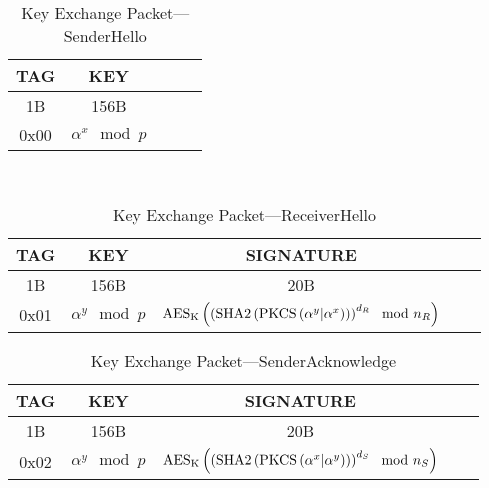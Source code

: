 \documentclass[a4paper]{article}
\begin{document}
\begin{table}[H]
    \begin{center}
        \begin{tabular}{| c | c | c | c | c |}
            \hline
            TAG & KEY \\ \hline\hline
            1B & 156B \\ \hline
            0x00 & $\alpha^x\mod{p}$ \\
            \hline
        \end{tabular}
    \end{center}
    \
    \caption{Key Exchange Packet---SenderHello}
    \label{tab:key_exchange_packet_senderhello}
\end{table}
\begin{table}[H]
    \begin{center}
        \begin{tabular}{| c | c | c | c | c |}
            \hline
            TAG & KEY & SIGNATURE \\ \hline\hline
            1B & 156B & 20B \\ \hline
            0x01 & $\alpha^y\mod{p}$ & $\text{AES}_\text{K}\left(\left(\text{SHA2}\left(\text{PKCS}\left(\alpha^y\small|\alpha^x\right)\right)\right)^{d_R}\mod{n_R}\right)$\\
            \hline
        \end{tabular}
    \end{center}
    
    \caption{Key Exchange Packet---ReceiverHello}
    \label{tab:key_exchange_packet_receiverhello}
\end{table}
\begin{table}[H]
    \begin{center}
        \begin{tabular}{| c | c | c | c | c |}
            \hline
            TAG & KEY & SIGNATURE \\ \hline\hline
            1B & 156B & 20B \\ \hline
            0x02 & $\alpha^y\mod{p}$ & $\text{AES}_\text{K}\left(\left(\text{SHA2}\left(\text{PKCS}\left(\alpha^x \small|\alpha^y\right)\right)\right)^{d_S}\mod{n_S}\right)$\\
            \hline
        \end{tabular}
    \end{center}
    
    \caption{Key Exchange Packet---SenderAcknowledge}
    \label{tab:key_exchange_packet_senderacknowledge}
\end{table}
\end{document}
